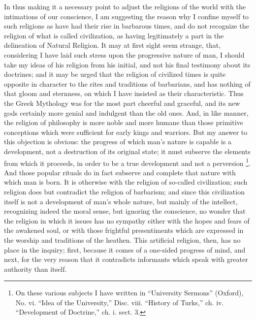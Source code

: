 In thus making it a necessary point to adjust the religions of the
world with the intimations of our conscience, I am suggesting the
reason why I confine myself to such religions as have had their rise
in barbarous times, and do not recognize the religion of what is
called civilization, as having legitimately a part in the delineation
of Natural Religion. It may at first sight seem strange, that,
considering I have laid such stress upon the progressive nature of
man, I should take my ideas of his religion from his initial, and not
his final testimony about its doctrines; and it may be urged that the
religion of civilized times is quite opposite in character to the
rites and traditions of barbarians, and has nothing of that gloom and
sternness, on which I have insisted as their characteristic. Thus the
Greek Mythology was for the most part cheerful and graceful, and its
new gods certainly more genial and indulgent than the old ones. And,
in like manner, the religion of philosophy is more noble and more
humane than those primitive conceptions which were sufficient for
early kings and warriors. But my answer to this objection is obvious:
the progress of which man's nature is capable is a development, not a
destruction of its original state; it must subserve the elements from
which it proceeds, in order to be a true development and not a
perversion \footnote{On these
various subjects I have written in ``University Sermons''
(Oxford), No. vi. ``Idea of the
University,'' Disc. viii.
``History of
Turks,'' ch. iv. ``Development of
Doctrine,'' ch. i. sect. 3.}. And
those popular rituals do in fact subserve and complete that nature
with which man is born. It is otherwise with the religion of so-called
civilization; such religion does but contradict the religion of
barbarism; and since this civilization itself is not a development of
man's whole nature, but mainly of the intellect, recognizing indeed
the moral sense, but ignoring the conscience, no wonder that the
religion in which it issues has no sympathy either with the hopes and
fears of the awakened soul, or with those frightful presentiments
which are expressed in the worship and traditions of the heathen. This
artificial religion, then, has no place in the inquiry; first, because
it comes of a one-sided progress of mind, and next, for the very
reason that it contradicts informants which speak with greater
authority than itself.

